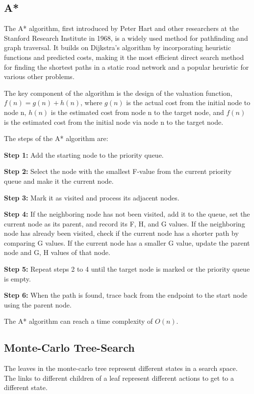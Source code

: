 \documentclass[bibliography=totoc]{scrartcl}
\begin{document}

\subsection{A*}
The A* algorithm, first introduced by Peter Hart and other researchers at the Stanford Research Institute in 1968, is a widely used method for pathfinding and graph traversal. \cite{4082128} It builds on Dijkstra's algorithm by incorporating heuristic functions and predicted costs, making it the most efficient direct search method for finding the shortest paths in a static road network and a popular heuristic for various other problems.\cite{ProbabilisticApproachCollaborativeMultiRobotLocalization}

The key component of the algorithm is the design of the valuation function, $f(n) = g(n) + h(n)$, where $g(n)$ is the actual cost from the initial node to node n, $h(n)$ is the estimated cost from node n to the target node, and $f(n)$ is the estimated cost from the initial node via node n to the target node.

The steps of the A* algorithm are:

\textbf{Step 1:} Add the starting node to the priority queue.

\textbf{Step 2:} Select the node with the smallest F-value from the current priority queue and make it the current node.

\textbf{Step 3:} Mark it as visited and process its adjacent nodes.

\textbf{Step 4:} If the neighboring node has not been visited, add it to the queue, set the current node as its parent, and record its F, H, and G values. If the neighboring node has already been visited, check if the current node has a shorter path by comparing G values. If the current node has a smaller G value, update the parent node and G, H values of that node.

\textbf{Step 5:} Repeat steps 2 to 4 until the target node is marked or the priority queue is empty.

\textbf{Step 6:} When the path is found, trace back from the endpoint to the start node using the parent node.

The A* algorithm can reach a time complexity of $O(n)$.

\subsection{Monte-Carlo Tree-Search}
The leaves in the monte-carlo tree represent different states in a search space. The links to different children of a leaf represent different actions to get to a different state.
\end{document}
